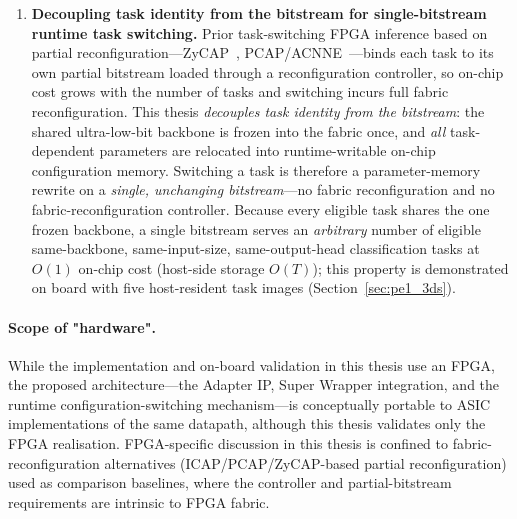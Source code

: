\documentclass[12pt, a4paper]{report}
\numberwithin{equation}{chapter}
\numberwithin{figure}{chapter}
\numberwithin{table}{chapter}
\numberwithin{algorithm}{chapter}
\begin{document}
\begin{enumerate}
  \item \textbf{Decoupling task identity from the bitstream for single-bitstream runtime task switching.} Prior task-switching FPGA inference based on partial reconfiguration---ZyCAP~\cite{Rangsikunpum2024CoarseToFine}, PCAP/ACNNE~\cite{Huang2024ACNNE}---binds each task to its own partial bitstream loaded through a reconfiguration controller, so on-chip cost grows with the number of tasks and switching incurs full fabric reconfiguration. This thesis \emph{decouples task identity from the bitstream}: the shared ultra-low-bit backbone is frozen into the fabric once, and \emph{all} task-dependent parameters are relocated into runtime-writable on-chip configuration memory. Switching a task is therefore a parameter-memory rewrite on a \emph{single, unchanging bitstream}---no fabric reconfiguration and no fabric-reconfiguration controller. Because every eligible task shares the one frozen backbone, a single bitstream serves an \emph{arbitrary} number of eligible same-backbone, same-input-size, same-output-head classification tasks at $O(1)$ on-chip cost (host-side storage $O(T)$); this property is demonstrated on board with five host-resident task images (Section~\ref{sec:pe1_3ds}).
\end{enumerate}

\paragraph{Scope of "hardware".} While the implementation and on-board validation in this thesis use an FPGA, the proposed architecture---the Adapter IP, Super Wrapper integration, and the runtime configuration-switching mechanism---is conceptually portable to ASIC implementations of the same datapath, although this thesis validates only the FPGA realisation. FPGA-specific discussion in this thesis is confined to fabric-reconfiguration alternatives (ICAP/PCAP/ZyCAP-based partial reconfiguration) used as comparison baselines, where the controller and partial-bitstream requirements are intrinsic to FPGA fabric.
\end{document}
